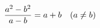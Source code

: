 \documentclass[preview]{standalone}
\begin{document}
\begin{align*}
\special{dvisvgm:raw <g id='unique000'>}\frac{a^2-b^2}{a-b}=a+b\quad (a\neq b)\special{dvisvgm:raw </g>}
\end{align*}
\end{document}
